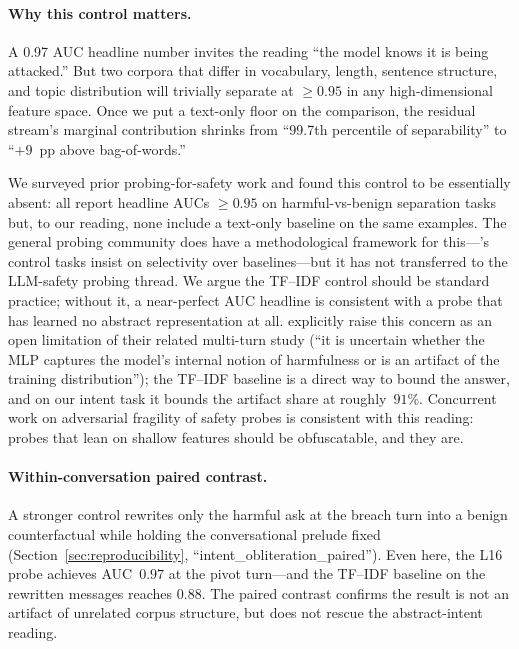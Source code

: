 \documentclass[11pt]{article}
\begin{document}
\paragraph{Why this control matters.}
A 0.97 AUC headline number invites the reading ``the model knows it is being attacked.'' But two corpora that differ in vocabulary, length, sentence structure, and topic distribution will trivially separate at $\geq$$0.95$ in any high-dimensional feature space. Once we put a text-only floor on the comparison, the residual stream's marginal contribution shrinks from ``99.7th percentile of separability'' to ``$+9$~pp above bag-of-words.''

We surveyed prior probing-for-safety work and found this control to be essentially absent: \citet{arditi2024refusal,zou2023repe,zhang2025jbshield,jiao2026siren,qian2024hsf,goldowsky2025deception,kulkarni2026latent} all report headline AUCs $\geq 0.95$ on harmful-vs-benign separation tasks but, to our reading, none include a text-only baseline on the same examples. The general probing community does have a methodological framework for this---\citet{hewitt2019control}'s control tasks insist on selectivity over baselines---but it has not transferred to the LLM-safety probing thread. We argue the TF--IDF control should be standard practice; without it, a near-perfect AUC headline is consistent with a probe that has learned no abstract representation at all. \citet{bullwinkel2025multiturnrep} explicitly raise this concern as an open limitation of their related multi-turn study (``it is uncertain whether the MLP captures the model's internal notion of harmfulness or is an artifact of the training distribution''); the TF--IDF baseline is a direct way to bound the answer, and on our intent task it bounds the artifact share at roughly~$91$\%. Concurrent work on adversarial fragility of safety probes \citep{bailey2024obfuscated} is consistent with this reading: probes that lean on shallow features should be obfuscatable, and they are.

\paragraph{Within-conversation paired contrast.}
A stronger control rewrites only the harmful ask at the breach turn into a benign counterfactual while holding the conversational prelude fixed (Section~\ref{sec:reproducibility}, ``intent\_obliteration\_paired''). Even here, the L16 probe achieves AUC~$0.97$ at the pivot turn---and the TF--IDF baseline on the rewritten messages reaches $0.88$. The paired contrast confirms the result is not an artifact of unrelated corpus structure, but does not rescue the abstract-intent reading.
\end{document}

